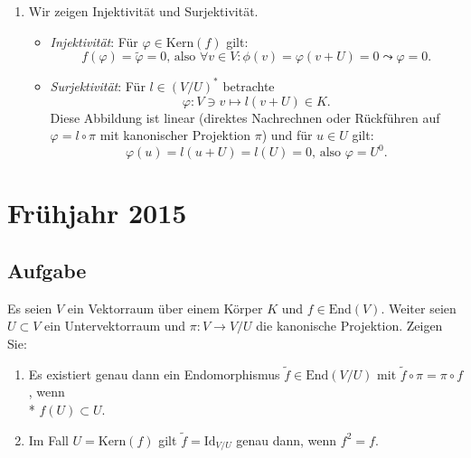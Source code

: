 \begin{enumerate}
	\item Wir zeigen Injektivität und Surjektivität.
	\begin{itemize}
		\item \emph{Injektivität}: Für \( \varphi \in \text{Kern}(f) \) gilt:
		\begin{equation*}
		 	f(\varphi) = \widetilde{\varphi} = 0\text{, also } \forall v \in V: \phi(v) = \varphi(v + U) = 0 \leadsto \varphi = 0\text{.}
		 \end{equation*} 
		 \item \emph{Surjektivität}: Für \( l \in (V/U)^\ast \) betrachte
		 \begin{equation*}
		 	\varphi: V \ni v \mapsto l(v+U) \in K\text{.}
		 \end{equation*}
		 Diese Abbildung ist linear (direktes Nachrechnen oder Rückführen auf \( \varphi = l \circ \pi \) mit kanonischer Projektion \( \pi \)) und für \( u \in U \) gilt:
		 \begin{equation*}
		 	\varphi(u) = l(u+U) = l(U) = 0\text{, also } \varphi = U^0\text{.}
		 \end{equation*}
	\end{itemize}
\end{enumerate}


\newpage


\section{Frühjahr 2015}

\subsection{Aufgabe}
Es seien \( V \) ein Vektorraum über einem Körper \( K \) und \( f \in \text{End}(V) \). Weiter seien \( U \subset V \) ein Untervektorraum und \( \pi: V \to V/U \) die kanonische Projektion. Zeigen Sie:
\begin{enumerate}
 	\item Es existiert genau dann ein Endomorphismus \( \widetilde{f} \in \text{End}(V/U) \) mit \( \widetilde{f} \circ \pi = \pi \circ f \), wenn \\* \( f(U) \subset U \).
 	\item Im Fall \( U = \text{Kern}(f) \) gilt \( \widetilde{f} = \text{Id}_{V/U} \) genau dann, wenn \( f^2 = f \). 
 \end{enumerate} 


